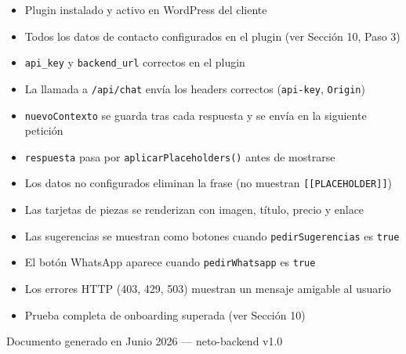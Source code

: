 \documentclass[12pt, a4paper]{article}
\begin{document}
\begin{tcolorbox}[colback=moradoclaro!50, colframe=moradooscuro,
                  title={\small\bfseries Lista de verificación --- equipo frontend}]
\begin{itemize}[label=$\square$, noitemsep]
  \item Plugin instalado y activo en WordPress del cliente
  \item Todos los datos de contacto configurados en el plugin (ver Sección 10, Paso 3)
  \item \texttt{api\_key} y \texttt{backend\_url} correctos en el plugin
  \item La llamada a \texttt{/api/chat} envía los headers correctos (\texttt{api-key}, \texttt{Origin})
  \item \texttt{nuevoContexto} se guarda tras cada respuesta y se envía en la siguiente petición
  \item \texttt{respuesta} pasa por \texttt{aplicarPlaceholders()} antes de mostrarse
  \item Los datos no configurados eliminan la frase (no muestran \texttt{[[PLACEHOLDER]]})
  \item Las tarjetas de piezas se renderizan con imagen, título, precio y enlace
  \item Las sugerencias se muestran como botones cuando \texttt{pedirSugerencias} es \texttt{true}
  \item El botón WhatsApp aparece cuando \texttt{pedirWhatsapp} es \texttt{true}
  \item Los errores HTTP (403, 429, 503) muestran un mensaje amigable al usuario
  \item Prueba completa de onboarding superada (ver Sección 10)
\end{itemize}
\end{tcolorbox}

\vspace{1.5cm}
\begin{center}
{\small\color{gray}
Documento generado en Junio 2026 --- neto-backend v1.0
}
\end{center}
\end{document}
